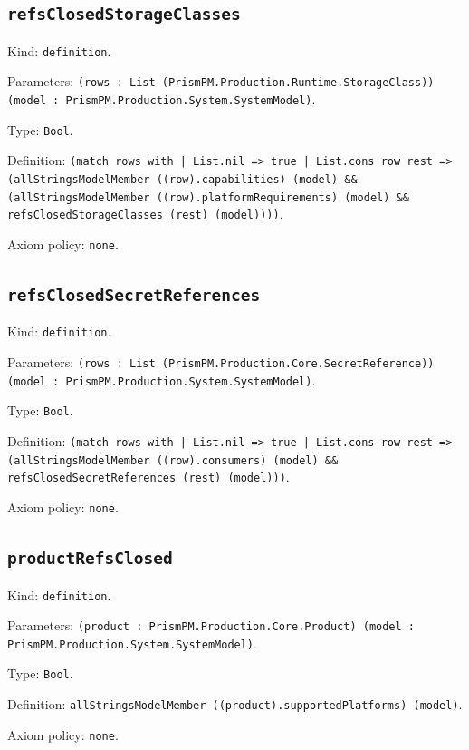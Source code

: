 \documentclass[11pt]{article}
\begin{document}
\subsection*{\texttt{refsClosedStorageClasses}}
\noindent Kind: \texttt{definition}.\par
\noindent Parameters: \texttt{(rows : List (PrismPM.Production.Runtime.StorageClass)) (model : PrismPM.Production.System.SystemModel)}.\par
\noindent Type: \texttt{Bool}.\par
\noindent Definition: \texttt{(match rows with | List.nil => true | List.cons row rest => (allStringsModelMember ((row).capabilities) (model) \&\& (allStringsModelMember ((row).platformRequirements) (model) \&\& refsClosedStorageClasses (rest) (model))))}.\par
\noindent Axiom policy: \texttt{none}.\par
\subsection*{\texttt{refsClosedSecretReferences}}
\noindent Kind: \texttt{definition}.\par
\noindent Parameters: \texttt{(rows : List (PrismPM.Production.Core.SecretReference)) (model : PrismPM.Production.System.SystemModel)}.\par
\noindent Type: \texttt{Bool}.\par
\noindent Definition: \texttt{(match rows with | List.nil => true | List.cons row rest => (allStringsModelMember ((row).consumers) (model) \&\& refsClosedSecretReferences (rest) (model)))}.\par
\noindent Axiom policy: \texttt{none}.\par
\subsection*{\texttt{productRefsClosed}}
\noindent Kind: \texttt{definition}.\par
\noindent Parameters: \texttt{(product : PrismPM.Production.Core.Product) (model : PrismPM.Production.System.SystemModel)}.\par
\noindent Type: \texttt{Bool}.\par
\noindent Definition: \texttt{allStringsModelMember ((product).supportedPlatforms) (model)}.\par
\noindent Axiom policy: \texttt{none}.\par
\end{document}
